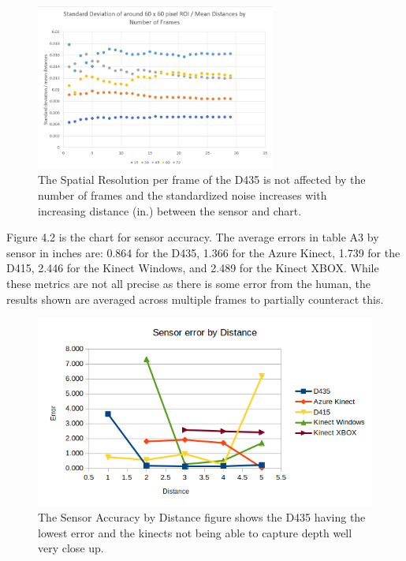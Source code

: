 \begin{figure}[!htb]
	\caption{The Spatial Resolution per frame of the D435 is not affected by the number of frames and the standardized noise increases with increasing distance (in.) between the sensor and chart.}
	\centering
	\includegraphics[width=0.7\textwidth]{images/D435_spatial_resolution.png}
\end{figure}

Figure 4.2 is the chart for sensor accuracy. The average errors in table A3 by sensor in inches are: 0.864 for the D435, 1.366 for the Azure Kinect, 1.739 for the D415, 2.446 for the Kinect Windows, and 2.489 for the Kinect XBOX. While these metrics are not all precise as there is some error from the human, the results shown are averaged across multiple frames to partially counteract this.
\begin{figure}[!htb]
	\caption{The Sensor Accuracy by Distance figure shows the D435 having the lowest error and the kinects not being able to capture depth well very close up.}
	\centering
	\includegraphics[width=1\textwidth]{images/sensor_accuracy.png}
\end{figure}

